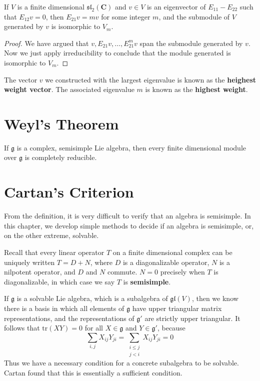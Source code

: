 \begin{corollary}
    If $V$ is a finite dimensional $\mathfrak{sl}_2(\mathbf{C})$ and $v \in V$ is an eigenvector of $E_{11} - E_{22}$ such that $E_{12}v = 0$, then $E_{21}v = mv$ for some integer $m$, and the submodule of $V$ generated by $v$ is isomorphic to $V_m$.
\end{corollary}
\begin{proof}
    We have argued that $v, E_{21} v, \dots, E_{21}^m v$ span the submodule generated by $v$. Now we just apply irreducibility to conclude that the module generated is isomorphic to $V_m$.
\end{proof}

The vector $v$ we constructed with the largest eigenvalue is known as the {\bf heighest weight vector}. The associated eigenvalue $m$ is known as the {\bf highest weight}.

\section{Weyl's Theorem}

\begin{theorem}[Weyl]
    If $\mathfrak{g}$ is a complex, semisimple Lie algebra, then every finite dimensional module over $\mathfrak{g}$ is completely reducible.
\end{theorem}

\section{Cartan's Criterion}

From the definition, it is very difficult to verify that an algebra is semisimple. In this chapter, we develop simple methods to decide if an algebra is semisimple, or, on the other extreme, solvable.

Recall that every linear operator $T$ on a finite dimensional complex can be uniquely written $T = D + N$, where $D$ is a diagonalizable operator, $N$ is a nilpotent operator, and $D$ and $N$ commute. $N = 0$ precisely when $T$ is diagonalizable, in which case we say $T$ is {\bf semisimple}.

If $\mathfrak{g}$ is a solvable Lie algebra, which is a subalgebra of $\mathfrak{gl}(V)$, then we know there is a basis in which all elements of $\mathfrak{g}$ have upper triangular matrix representations, and the representations of $\mathfrak{g}'$ are strictly upper triangular. It follows that $\text{tr}(XY) = 0$ for all $X \in \mathfrak{g}$ and $Y \in \mathfrak{g}'$, because
%
\[ \sum_{i,j} X_{ij}Y_{ji} = \sum_{\substack{i \leq j\\j < i}} X_{ij} Y_{ji} = 0 \]
%
Thus we have a necessary condition for a concrete subalgebra to be solvable. Cartan found that this is essentially a sufficient condition.


